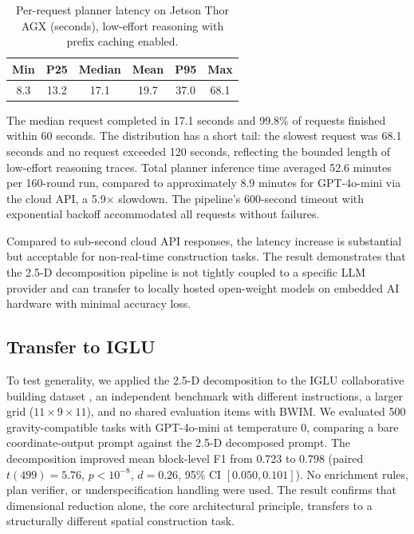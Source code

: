 \documentclass{article}
\begin{document}
\begin{table}[ht]
\centering
\small
\begin{tabular}{@{}cccccc@{}}
\toprule
\textbf{Min} & \textbf{P25} & \textbf{Median} & \textbf{Mean} & \textbf{P95} & \textbf{Max} \\
\midrule
8.3 & 13.2 & 17.1 & 19.7 & 37.0 & 68.1 \\
\bottomrule
\end{tabular}
\caption{Per-request planner latency on Jetson Thor AGX (seconds), low-effort
reasoning with prefix caching enabled.}
\label{tab:latency}
\end{table}

The median request completed in 17.1 seconds and 99.8\% of requests
finished within 60 seconds. The distribution has a short tail: the
slowest request was 68.1 seconds and no request exceeded 120 seconds,
reflecting the bounded length of low-effort reasoning traces. Total
planner inference time averaged 52.6 minutes per 160-round run, compared
to approximately 8.9 minutes for GPT-4o-mini via the cloud API, a
5.9$\times$ slowdown. The pipeline's 600-second timeout with exponential
backoff accommodated all requests without failures.

Compared to sub-second cloud API responses, the latency increase is
substantial but acceptable for non-real-time construction tasks. The
result demonstrates that the 2.5-D decomposition pipeline is not tightly
coupled to a specific LLM provider and can transfer to locally hosted
open-weight models on embedded AI hardware with minimal accuracy loss.

\subsection{Transfer to IGLU}

To test generality, we applied the 2.5-D decomposition to the IGLU
collaborative building dataset \cite{iglu2022}, an independent benchmark
with different instructions, a larger grid ($11 \times 9 \times 11$),
and no shared evaluation items with BWIM. We evaluated 500 gravity-compatible
tasks with GPT-4o-mini at temperature 0, comparing a bare coordinate-output
prompt against the 2.5-D decomposed prompt. The decomposition improved mean
block-level F1 from 0.723 to 0.798 (paired $t(499) = 5.76$, $p < 10^{-8}$,
$d = 0.26$, 95\% CI $[0.050, 0.101]$). No enrichment rules, plan verifier,
or underspecification handling were used. The result confirms that
dimensional reduction alone, the core architectural principle, transfers
to a structurally different spatial construction task.
\end{document}
